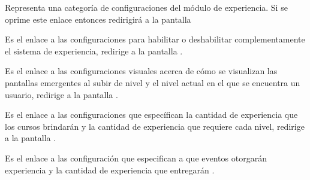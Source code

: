     \begin{description}[font=\color{primary}]

            Representa una categoría de configuraciones del módulo de experiencia. Si se oprime
            este enlace entonces redirigirá a la pantalla \hfill

        \begin{description}[font={\labelitemi\ \color{black}}]

            Es el enlace a las configuraciones para habilitar o deshabilitar complementamente
            el sistema de experiencia, redirige a la pantalla .

            Es el enlace a las configuraciones visuales acerca de cómo se visualizan las
            pantallas emergentes al subir de nivel y el nivel actual en el que se encuentra
            un usuario, redirige a la pantalla .

            Es el enlace a las configuraciones que específican la cantidad de experiencia que
            los cursos brindarán y la cantidad de experiencia que requiere cada nivel, redirige
            a la pantalla .

            Es el enlace a las configuración que especifican a que eventos otorgarán experiencia
            y la cantidad de experiencia que entregarán .
        \end{description}

    \end{description}

\clearpage
